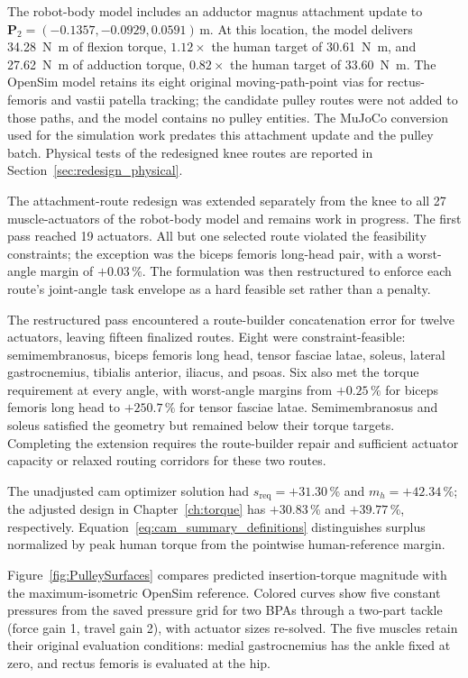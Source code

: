 The robot-body model includes an adductor magnus attachment update to $\mathbf{P}_2=(-0.1357,-0.0929,0.0591)\,\unit{\meter}$. At this location, the model delivers \qty{34.28}{\newton\meter} of flexion torque, $1.12\times$ the human target of \qty{30.61}{\newton\meter}, and \qty{27.62}{\newton\meter} of adduction torque, $0.82\times$ the human target of \qty{33.60}{\newton\meter}. The OpenSim model retains its eight original moving-path-point vias for rectus-femoris and vastii patella tracking; the candidate pulley routes were not added to those paths, and the model contains no pulley entities. The MuJoCo conversion used for the simulation work predates this attachment update and the pulley batch. Physical tests of the redesigned knee routes are reported in Section~\ref{sec:redesign_physical}.

The attachment-route redesign was extended separately from the knee to all 27 muscle-actuators of the robot-body model and remains work in progress. The first pass reached 19 actuators. All but one selected route violated the feasibility constraints; the exception was the biceps femoris long-head pair, with a worst-angle margin of $+0.03\,\%$. The formulation was then restructured to enforce each route's joint-angle task envelope as a hard feasible set rather than a penalty.

The restructured pass encountered a route-builder concatenation error for twelve actuators, leaving fifteen finalized routes. Eight were constraint-feasible: semimembranosus, biceps femoris long head, tensor fasciae latae, soleus, lateral gastrocnemius, tibialis anterior, iliacus, and psoas. Six also met the torque requirement at every angle, with worst-angle margins from $+0.25\,\%$ for biceps femoris long head to $+250.7\,\%$ for tensor fasciae latae. Semimembranosus and soleus satisfied the geometry but remained below their torque targets. Completing the extension requires the route-builder repair and sufficient actuator capacity or relaxed routing corridors for these two routes.

The unadjusted cam optimizer solution had $s_{\mathrm{req}}=+31.30$\,\% and $m_h=+42.34$\,\%; the adjusted design in Chapter~\ref{ch:torque} has $+30.83$\,\% and $+39.77$\,\%, respectively. Equation~\eqref{eq:cam_summary_definitions} distinguishes surplus normalized by peak human torque from the pointwise human-reference margin.

Figure~\ref{fig:PulleySurfaces} compares predicted insertion-torque magnitude with the maximum-isometric OpenSim reference. Colored curves show five constant pressures from the saved pressure grid for two BPAs through a two-part tackle (force gain 1, travel gain 2), with actuator sizes re-solved. The five muscles retain their original evaluation conditions: medial gastrocnemius has the ankle fixed at zero, and rectus femoris is evaluated at the hip.

